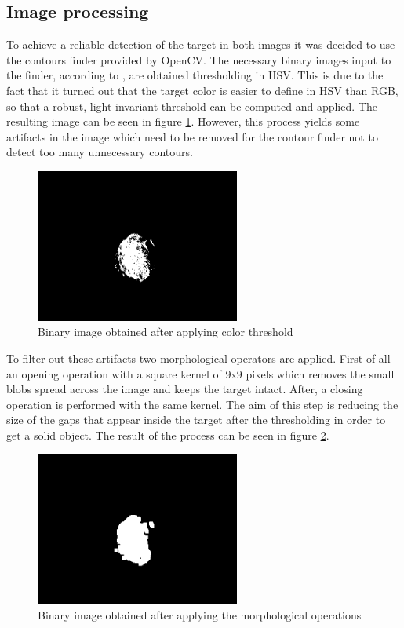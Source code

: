 \subsection{Image processing}
To achieve a reliable detection of the target in both images it was decided to use the contours finder provided by OpenCV.
The necessary binary images input to the finder, according to \cite{suzuki}, are obtained thresholding in HSV.
This is due to the fact that it turned out that the target color is easier to define in HSV than RGB, so that a robust, light invariant threshold can be computed and applied. The resulting image can be seen in figure \ref{fig:binary_image}.
However, this process yields some artifacts in the image which need to be removed for the contour finder not to detect too many unnecessary contours.

\begin{figure}[!ht]
    \centering
    \includegraphics[width=0.6\textwidth]{figures/binary.png}
    \caption{Binary image obtained after applying color threshold}
    \label{fig:binary_image}
\end{figure}

To filter out these artifacts two morphological operators are applied. First of all an opening operation with a square kernel of 9x9 pixels which removes the small blobs spread across the image and keeps the target intact. After, a closing operation is performed with the same kernel. The aim of this step is reducing the size of the gaps that appear inside the target after the thresholding in order to get a solid object. The result of the process can be seen in figure \ref{fig:filtered_image}.

\begin{figure}[h]
    \centering
    \includegraphics[width=0.6\textwidth]{figures/filtered.png}
    \caption{Binary image obtained after applying the morphological operations}
    \label{fig:filtered_image}
\end{figure}

